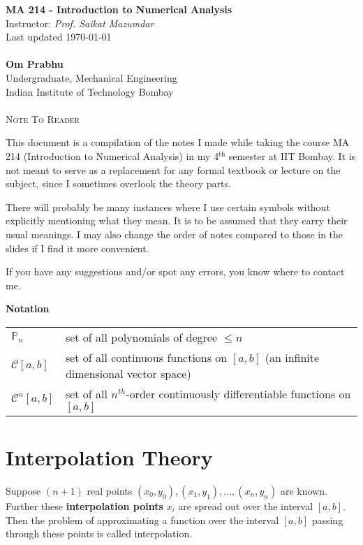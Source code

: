\documentclass[11pt]{article}
\theoremstyle{definition}
\begin{document}
\begin{center}
{\LARGE \bf MA 214 - Introduction to Numerical Analysis}\\
{Instructor: \textit{Prof. Saikat Mazumdar}}\\
Last updated \today \\~\\
{\large \bf Om Prabhu}\\
Undergraduate, Mechanical Engineering\\
Indian Institute of Technology Bombay\\~\\
\textsc{Note To Reader}
\end{center}
\vspace{-6pt}

This document is a compilation of the notes I made while taking the course MA 214 (Introduction to Numerical Analysis) in my 4$^{\text{th}}$ semester at IIT Bombay. It is not meant to serve as a replacement for any formal textbook or lecture on the subject, since I sometimes overlook the theory parts.

There will probably be many instances where I use certain symbols without explicitly mentioning what they mean. It is to be assumed that they carry their usual meanings. I may also change the order of notes compared to those in the slides if I find it more convenient.

If you have any suggestions and/or spot any errors, you know where to contact me.

\hrulefill
\vspace{-5mm}
\tableofcontents
\hrulefill
\vspace{2mm}

{\large \bf Notation}
\vspace{2mm}

\begin{tabular}{p{}p{}}
$\mathbb{P}_n$ & set of all polynomials of degree $\leqslant n$\\
$\mathcal{C}[a,b]$ & set of all continuous functions on $[a,b]$ (an infinite dimensional vector space)\\
$\mathcal{C}^n[a,b]$ & set of all $n^{th}$-order continuously differentiable functions on $[a,b]$ 
\end{tabular}
\vspace{-2mm}
 
\hrulefill

\newpage
\section{Interpolation Theory}
Suppose $(n+1)$ real points $(x_0,y_0), (x_1,y_1),\dots,(x_n,y_n)$ are known. Further these \textbf{interpolation points} $x_i$ are spread out over the interval $[a,b]$. Then the problem of approximating a function over the interval $[a,b]$ passing through these points is called interpolation.
\end{document}
